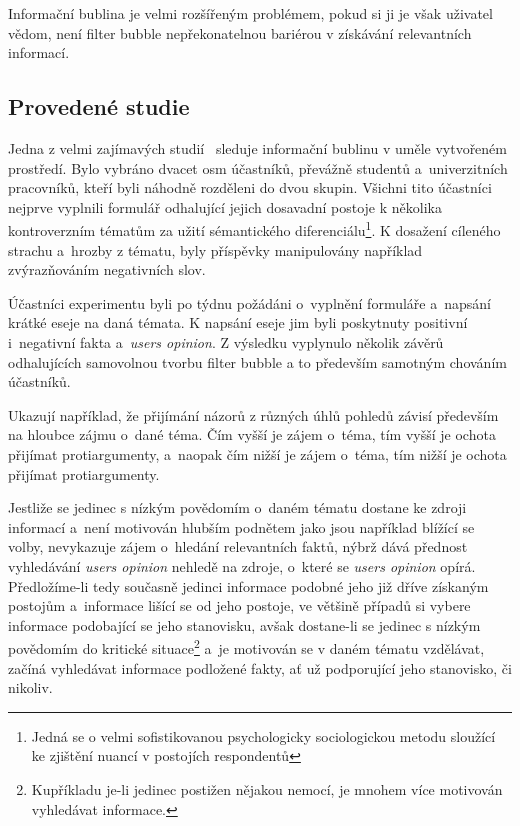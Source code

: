 \documentclass[12pt, a4paper]{article}
\numberwithin{equation}{section} 	%
\begin{document}
Informační bublina je velmi rozšířeným problémem, pokud si ji je však uživatel vědom, není filter bubble nepřekonatelnou bariérou v získávání relevantních informací.

\subsection{Provedené studie}
\noindent Jedna z velmi zajímavých studií~\cite{BeyondFilterBubble} sleduje informační bublinu v uměle vytvořeném prostředí. Bylo vybráno dvacet osm účastníků, převážně studentů a~univerzitních pracovníků, kteří byli náhodně rozděleni do dvou skupin. Všichni tito účastníci nejprve vyplnili formulář odhalující jejich dosavadní postoje k několika kontroverzním tématům za užití sémantického diferenciálu\footnote{Jedná se o velmi sofistikovanou psychologicky sociologickou metodu sloužící ke zjištění nuancí v postojích respondentů}. K dosažení cíleného strachu a~hrozby z tématu, byly příspěvky manipulovány například zvýrazňováním negativních slov.

Účastníci experimentu byli po týdnu požádáni o~vyplnění formuláře a~napsání krátké eseje na daná témata. K napsání eseje jim byli poskytnuty positivní i~negativní fakta a~\textit{users opinion}. Z výsledku vyplynulo několik závěrů odhalujících samovolnou tvorbu filter bubble a to především samotným chováním účastníků.

 Ukazují například, že přijímání názorů z různých úhlů pohledů závisí především na hloubce zájmu o~dané téma. Čím vyšší je zájem o~téma, tím vyšší je ochota přijímat protiargumenty, a~naopak čím nižší je zájem o~téma, tím nižší je ochota přijímat protiargumenty.

Jestliže se jedinec s nízkým povědomím o~daném tématu dostane ke zdroji informací a~není motivován hlubším podnětem jako jsou například blížící se volby, nevykazuje zájem o~hledání relevantních faktů, nýbrž dává přednost vyhledávání \textit{users opinion} nehledě na zdroje, o~které se \textit{users opinion} opírá. Předložíme-li tedy současně jedinci informace podobné jeho již dříve získaným postojům a~informace lišící se od jeho postoje, ve většině případů si vybere informace podobající se jeho stanovisku, avšak dostane-li se jedinec s nízkým povědomím do kritické situace\footnote{Kupříkladu je-li jedinec postižen nějakou nemocí, je mnohem více motivován vyhledávat informace.} a~je motivován se v daném tématu vzdělávat, začíná vyhledávat informace podložené fakty, ať už podporující jeho stanovisko, či nikoliv.
\end{document}
